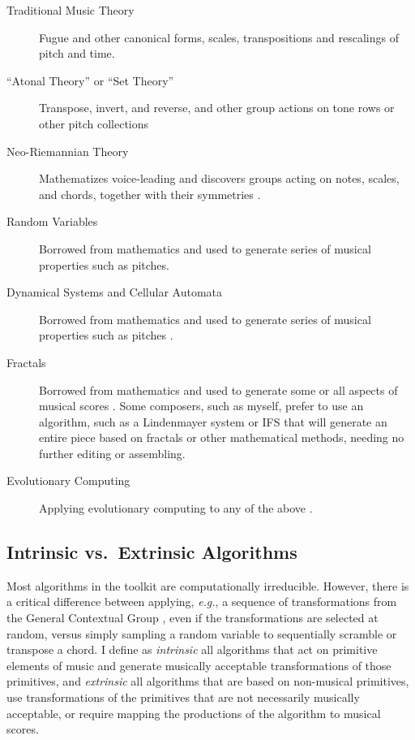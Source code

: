 \documentclass[11pt,papersize=a4]{scrartcl}
\begin{document}
\begin{description}
\item[Traditional Music Theory] Fugue and other canonical forms, scales, transpositions and rescalings of pitch and time.
\item[``Atonal Theory'' or ``Set Theory''] Transpose, invert, and reverse, and other group actions on tone rows or other pitch collections \parencite{rahn1991basic}
\item[Neo-Riemannian Theory] Mathematizes voice-leading and discovers groups acting on notes, scales, and chords, together with their symmetries \parencite{geometryofchords, tymoczko2006geometry, callender2008generalized}.
\item[Random Variables] Borrowed from mathematics and used to generate series of musical properties such as pitches.
\item[Dynamical Systems and Cellular Automata] Borrowed from mathematics and used to generate series of musical properties such as pitches \parencite{Miranda1993}.
\item[Fractals] Borrowed from mathematics and used to generate some or all aspects of musical scores \parencite{miranda2001composing, madden2007fractals}. Some composers, such as myself, prefer to use an algorithm, such as a Lindenmayer system \parencite{algorithmicbeautyofplants, prusinkiewicz1986sgs,  fractalmusicwithstringrewritinggrammars} or IFS \parencite{fractalseverywhere, ifsmusic} that will generate an entire piece based on fractals or other mathematical methods, needing no further editing or assembling. 
\item[Evolutionary Computing] Applying evolutionary computing to any of the above \parencite{miranda2007evolutionary}.
\end{description}

\subsection*{Intrinsic vs.\ Extrinsic Algorithms}

Most algorithms in the toolkit are computationally irreducible. However, there is a critical difference between applying, \emph{e.g.}, a sequence of transformations from the General Contextual Group \parencite{fiore2005gcg}, even if the transformations are selected at random, versus simply sampling a random variable to sequentially scramble or transpose a chord. I define as \emph{intrinsic} all algorithms that act on primitive elements of music and generate musically acceptable transformations of those primitives, and \emph{extrinsic} all algorithms that are based on non-musical primitives, use transformations of the primitives that are not necessarily musically acceptable, or require mapping the productions of the algorithm to musical scores.
\end{document}
